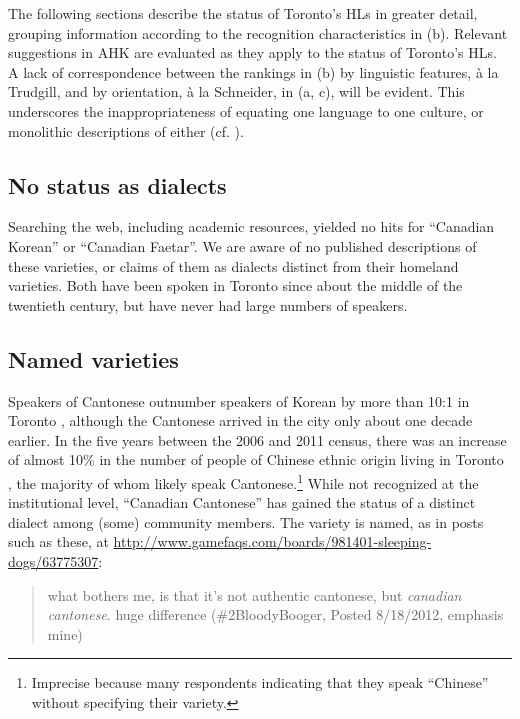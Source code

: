 \documentclass[output=paper]{LSP/langsci}
\begin{document}
The following sections describe the status of Toronto’s HLs in greater detail, grouping information according to the recognition characteristics in  (b). Relevant suggestions in AHK are evaluated as they apply to the status of Toronto’s HLs. A lack of correspondence between the rankings in  (b) by linguistic features, à la Trudgill, and by orientation, à la Schneider, in  (a, c), will be evident. This underscores the inappropriateness of equating one language to one culture, or monolithic descriptions of either (cf. \citealt{foley_personhood_2005}). 

\subsection{No status as dialects}

Searching the web, including academic resources, yielded no hits for “Canadian Korean” or “Canadian Faetar”. We are aware of no published descriptions of these varieties, or claims of them as dialects distinct from their homeland varieties. Both have been spoken in Toronto since about the middle of the twentieth century, but have never had large numbers of speakers.

\subsection{Named varieties}

Speakers of Cantonese outnumber speakers of Korean by more than 10:1 in Toronto \citep{statistics_canada_census_2011}, although the Cantonese arrived in the city only about one decade earlier. In the five years between the 2006 and 2011 census, there was an increase of almost 10\% in the number of people of Chinese ethnic origin living in Toronto \citep{statistics_canada_2011_2011}, the majority of whom likely speak Cantonese.\footnote{ Imprecise because many respondents indicating that they speak “Chinese” without specifying their variety. } While not recognized at the institutional level, “Canadian Cantonese” has gained the status of a distinct dialect among (some) community members. The variety is named, as in posts such as these, at \url{http://www.gamefaqs.com/boards/981401-sleeping-dogs/63775307}:

\begin{quote}
what bothers me, is that it’s not authentic cantonese, but \textit{canadian cantonese}. huge difference (\#2BloodyBooger, Posted 8/18/2012, emphasis mine)
\end{quote}
\end{document}
